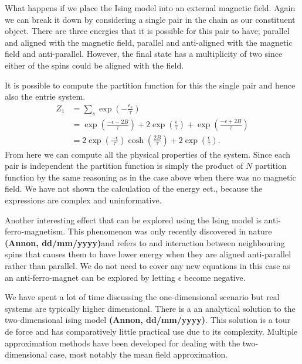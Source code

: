 \documentclass[a4paper]{article}
\def\citation{{\bfseries (Annon, dd/mm/yyyy)}}
\begin{document}
\begin{multicols}{2}
        What happens if we place the Ising model into an external magnetic %
        field. Again we can break it down by considering a single pair %
        in the chain as our constituent object. There are three energies %
        that it is possible for this pair to have; parallel and aligned %
        with the magnetic field, parallel and anti-aligned with the %
        magnetic field and anti-parallel. However, the final state has a %
        multiplicity of two since either of the spins could be aligned %
        with the field. 


        It is possible to compute the partition function for this the single %
        pair and hence also the entrie system.
        \begin{align}
            Z_{1} &= \sum_{s}\exp\left(-\frac{\epsilon_{s}}{\tau}\right)
                    \nonumber\\
                &= \exp\left(\frac{-\epsilon - 2B}{\tau}\right) +
                    2\exp\left(\frac{\epsilon}{\tau}\right) +
                    \exp\left(\frac{-\epsilon + 2B}{\tau}\right)
                    \nonumber\\
                &= 2\exp\left(\frac{-\epsilon}{\tau}\right)
                    \cosh\left(\frac{2B}{\tau}\right) + 
                    2\exp\left(\frac{\epsilon}{\tau}\right).
           \label{eqn:14}
        \end{align}
        From here we can compute all the physical properties of the system. %
        Since each pair is independent the partition function is simply the %
        product of \(N\) partition function by the same reasoning as in %
        the case above when there was no magnetic field. We have not shown %
        the calculation of the energy ect., because the expressions are %
        complex and uninformative. 


        Another interesting effect that can be explored using the Ising model %
        is anti-ferro-magnetism. This phenomenon was only recently discovered %
        in nature \citation and refers to and interaction between neighbouring %
        spins that causes them to have lower energy when they are aligned %
        anti-parallel rather than parallel. We do not need to cover any new %
        equations in this case as an anti-ferro-magnet can be explored by %
        letting \(\epsilon\) become negative. 


        We have spent a lot of time discussing the one-dimensional scenario %
        but real systems are typically higher dimensional. There is a %
        an analytical solution to the two-dimensional ising model \citation. %
        This solution is a tour de force and has comparatively little %
        practical use due to its complexity. Multiple approximation methods %
        have been developed for dealing with the two-dimensional case, %
        most notably the mean field approximation. 



\end{multicols}
\end{document}
